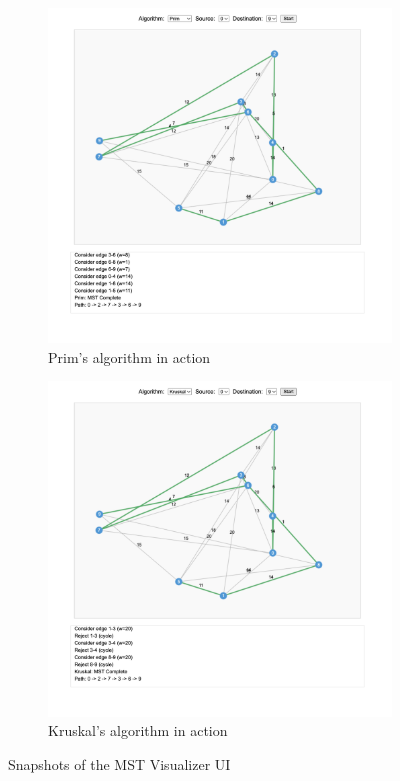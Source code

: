 \documentclass[12pt]{article}
\begin{document}
\clearpage
\begin{figure}[h]
    \centering
    \begin{subfigure}{0.7\textwidth}
      \includegraphics[width=\linewidth]{images/vis_prim.png}
      \caption{Prim's algorithm in action}
    \end{subfigure}\hfill
    \begin{subfigure}{0.7\textwidth}
      \includegraphics[width=\linewidth]{images/vis_kruskal.png}
      \caption{Kruskal's algorithm in action}
    \end{subfigure}
    \caption{Snapshots of the MST Visualizer UI}
    \label{fig:ui}
\end{figure}
\end{document}
